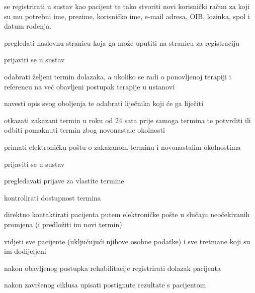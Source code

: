 			
			\begin{packed_enum}
				\item  {}
				
				\begin{packed_enum}
					
					\item se registrirati u sustav kao pacijent te tako stvoriti novi korisnički račun za koji su mu potrebni ime, prezime, korisničko ime, e-mail adresa, OIB, lozinka, spol i datum rođenja.
					\item pregledati naslovnu stranicu koja ga može uputiti na stranicu za registraciju
					
					
				\end{packed_enum}
			
				\item  {}
				
				\begin{packed_enum}
					
					\item prijaviti se u sustav
					\item odabrati željeni termin dolazaka, a ukoliko se radi o ponovljenoj terapiji i referencu na već obavljeni postupak terapije u ustanovi
					\item navesti opis svog oboljenja te odabrati liječnika koji će ga liječiti
					\item otkazati zakazani termin u roku od 24 sata prije samoga termina te potvrditi ili odbiti pomaknuti termin zbog novonastale okolnosti
					\item primati elektroničku poštu o zakazanom terminu i novonastalim okolnostima
					
				\end{packed_enum}
			
			
			\item  {}
			
			\begin{packed_enum}
				
				\item prijaviti se u sustav
				\item pregledavati prijave za vlastite termine
				\item kontrolirati dostupnost termina
				\item direktno kontaktirati pacijenta putem elektroničke pošte u slučaju neočekivanih promjena (i predložiti im novi termin)
				\item vidjeti sve pacijente (uključujući njihove osobne podatke) i sve tretmane koji su im dodijeljeni
				\item nakon obavljenog postupka rehabilitacije registrirati dolazak pacijenta
				\item nakon završenog ciklusa upisati postignute rezultate s pacijentom
				

\end{packed_enum}
\end{packed_enum}
